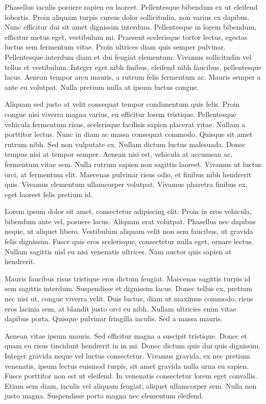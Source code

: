 \documentclass[12pt]{article}
\begin{document}
Phasellus iaculis posuere sapien eu laoreet. Pellentesque bibendum ex ut eleifend lobortis. Proin aliquam turpis cursus dolor sollicitudin, non varius ex dapibus. Nunc efficitur dui sit amet dignissim interdum. Pellentesque in lorem bibendum, efficitur metus eget, vestibulum mi. Praesent scelerisque tortor lectus, egestas luctus sem fermentum vitae. Proin ultrices diam quis semper pulvinar. Pellentesque interdum diam et dui feugiat elementum. Vivamus sollicitudin vel tellus et vestibulum. Integer eget nibh finibus, eleifend nibh faucibus, pellentesque lacus. Aenean tempor arcu mauris, a rutrum felis fermentum ac. Mauris semper a ante eu volutpat. Nulla pretium nulla at ipsum luctus congue.

Aliquam sed justo at velit consequat tempor condimentum quis felis. Proin congue nisi viverra magna varius, eu efficitur lorem tristique. Pellentesque vehicula fermentum risus, scelerisque facilisis sapien placerat vitae. Nullam a porttitor lectus. Nunc in diam ac massa consequat commodo. Quisque sit amet rutrum nibh. Sed non vulputate ex. Nullam dictum luctus malesuada. Donec tempus nisi at tempor semper. Aenean nisi est, vehicula at accumsan ac, fermentum vitae sem. Nulla rutrum sapien non sagittis laoreet. Vivamus ut luctus orci, at fermentum elit. Maecenas pulvinar risus odio, et finibus nibh hendrerit quis. Vivamus elementum ullamcorper volutpat. Vivamus pharetra finibus ex, eget laoreet felis pretium id. 



Lorem ipsum dolor sit amet, consectetur adipiscing elit. Proin in eros vehicula, bibendum ante vel, posuere lacus. Aliquam erat volutpat. Phasellus nec dapibus neque, ut aliquet libero. Vestibulum aliquam velit non sem faucibus, ut gravida felis dignissim. Fusce quis eros scelerisque, consectetur nulla eget, ornare lectus. Nullam sagittis nisl eu nisi venenatis ultrices. Nam auctor quis sapien at hendrerit.

Mauris faucibus risus tristique eros dictum feugiat. Maecenas sagittis turpis id sem sagittis interdum. Suspendisse et dignissim lacus. Donec tellus ex, pretium nec nisi ut, congue viverra velit. Duis luctus, diam ut maximus commodo, risus eros lacinia sem, at blandit justo orci eu nibh. Nullam ultricies enim vitae dapibus porta. Quisque pulvinar fringilla iaculis. Sed a massa mauris.

Aenean vitae ipsum mauris. Sed efficitur magna a suscipit tristique. Donec et quam eu risus tincidunt hendrerit in in mi. Donec dictum quis dui quis dignissim. Integer gravida neque vel luctus consectetur. Vivamus gravida, ex nec pretium venenatis, ipsum lectus euismod turpis, sit amet gravida nulla urna eu sapien. Fusce porttitor non est ut eleifend. In venenatis consectetur lorem eget convallis. Etiam sem diam, iaculis vel aliquam feugiat, aliquet ullamcorper sem. Nulla non justo magna. Suspendisse porta magna nec elementum eleifend.
\end{document}
